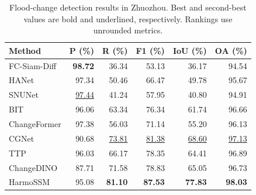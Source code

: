 \begingroup
\begin{table}[H]
\centering
\comparisonfont
\captionsetup{name=Table,font=comparisoncaption,labelfont=bf,labelsep=newline,justification=raggedright,singlelinecheck=false}
\caption{Flood-change detection results in Zhuozhou. Best and second-best values are bold and underlined, respectively. Rankings use unrounded metrics.}
\label{tab:comparison_zhuozhou}
\fontsize{10}{12}\selectfont
\setlength{\tabcolsep}{6pt}
\renewcommand{\arraystretch}{1.15}
\begin{tabular*}{\linewidth}{@{\extracolsep{\fill}}lrrrrr@{}}
\toprule
Method & P (\%) & R (\%) & F1 (\%) & IoU (\%) & OA (\%) \\
\midrule
FC-Siam-Diff & \textbf{98.72} & 36.34 & 53.13 & 36.17 & 94.54 \\
HANet & 97.34 & 50.46 & 66.47 & 49.78 & 95.67 \\
SNUNet & \underline{97.44} & 41.24 & 57.95 & 40.80 & 94.91 \\
BIT & 96.06 & 63.34 & 76.34 & 61.74 & 96.66 \\
ChangeFormer & 97.38 & 56.03 & 71.14 & 55.20 & 96.13 \\
CGNet & 90.68 & \underline{73.81} & \underline{81.38} & \underline{68.60} & \underline{97.13} \\
TTP & 96.03 & 66.17 & 78.35 & 64.41 & 96.89 \\
ChangeDINO & 87.71 & 71.58 & 78.83 & 65.05 & 96.73 \\
HarmoSSM & 95.08 & \textbf{81.10} & \textbf{87.53} & \textbf{77.83} & \textbf{98.03} \\
\bottomrule
\end{tabular*}
\end{table}
\endgroup

